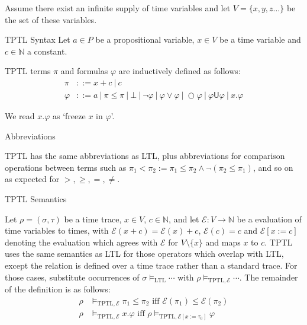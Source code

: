 \documentclass[a4paper]{article}
\newcommand{\U}{\mathsf{U}}
\newcommand{\tiff}{\text{ iff }}
\newcommand{\eval}{\mathcal{E}}
\begin{document}
Assume there exist an infinite supply of time variables  and let $V=\{x,y,z\dots\}$ be the set of these variables.

\begin{defn}{TPTL Syntax}\label{tptlsyn}
  Let $a\in P$ be a propositional variable, $x\in V$ be a time variable and $c\in\mathbb{N}$ a constant.

  TPTL terms $\pi$ and formulas $\varphi$ are inductively defined as follows:
  \begin{align*}
    \pi &::= x + c ~|~ c\\
    \varphi &::= a ~|~ \pi \leq \pi ~|~ \bot ~|~ \neg \varphi ~|~\varphi \lor \varphi ~|~ \bigcirc \varphi ~|~ \varphi \U \varphi ~|~ x. \varphi
  \end{align*}
\end{defn}

We read $x. \varphi$ as `freeze $x$ in $\varphi$'.

\begin{notn}{Abbreviations}\label{tptlabbrev}

  TPTL has the same abbreviations as LTL, plus abbreviations for comparison operations between terms such as $\pi_1 < \pi_2 := \pi_1 \leq \pi_2 \land \neg(\pi_2 \leq \pi_1)$, and so on as expected for $>,\geq,=,\neq$.
\end{notn}

\begin{defn}{TPTL Semantics}\label{tptlsem}

  Let $\rho = (\sigma,\tau)$ be a time trace, $x\in V$, $c\in\mathbb{N}$, and let $\eval:V\to\mathbb{N}$ be a evaluation of time variables to times, with $\eval(x + c) = \eval(x) + c$, $\eval(c) = c$ and $\eval[x:=c]$ denoting the evaluation which agrees with $\eval$ for $V\setminus\{x\}$ and maps $x$ to $c$.
  TPTL uses the same semantics as LTL for those operators which overlap with LTL, except the relation is defined over a time trace rather than a standard trace. For those cases, substitute occurrences of $\sigma\vDash_{\text{LTL}}\cdots$ with $\rho\vDash_{\text{TPTL},\eval}\cdots$. The remainder of the definition is as follows:
  \begin{align*}
    \rho&\vDash_{\text{TPTL},\eval}\pi_1\leq\pi_2 \tiff \eval(\pi_1)\leq\eval(\pi_2)\\
    \rho&\vDash_{\text{TPTL},\eval} x.\varphi \tiff \rho\vDash_{\text{TPTL},\eval[x:=\tau_0]}\varphi
  \end{align*}
\end{defn}
\end{document}
